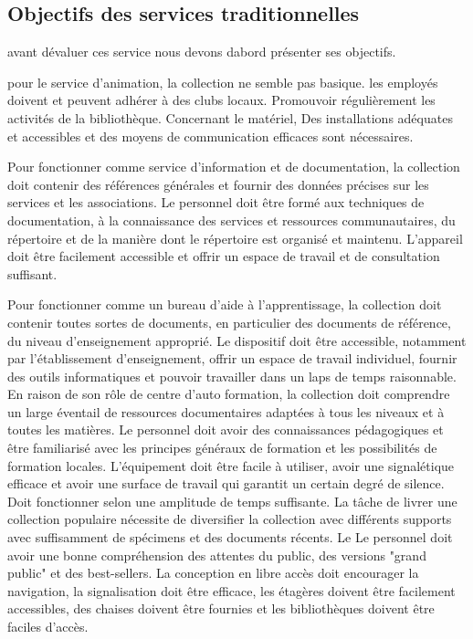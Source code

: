 \documentclass[french,a4paper,12pt]{article}
\begin{document}
\subsection{Objectifs des services traditionnelles}

\quad avant dévaluer ces service nous devons dabord présenter ses objectifs.

\quad pour le service  d'animation, la collection ne semble pas basique.  les employés doivent et peuvent adhérer à des clubs locaux. Promouvoir régulièrement les activités de la bibliothèque. Concernant le matériel, Des installations adéquates et accessibles et des moyens de communication efficaces sont nécessaires. 

\quad Pour fonctionner comme service d'information et de documentation, la collection doit contenir des références générales et fournir des données précises sur les services et les associations. Le personnel doit être formé aux techniques de documentation, à la connaissance des services et ressources communautaires, du répertoire et de la manière dont le répertoire est organisé et maintenu. L'appareil doit être facilement accessible et offrir un espace de travail et de consultation suffisant.  

\quad Pour fonctionner comme un bureau d'aide à l'apprentissage, la collection doit contenir toutes sortes de documents, en particulier des documents de référence, du niveau d'enseignement approprié. Le dispositif doit être accessible, notamment par l'établissement d'enseignement, offrir un espace de travail individuel, fournir des outils informatiques et pouvoir travailler dans un laps de temps raisonnable. 
En raison de son rôle de centre d'auto formation, la collection doit comprendre un large éventail de ressources documentaires adaptées à tous les niveaux et à toutes les matières. Le personnel doit avoir des connaissances pédagogiques et être familiarisé avec les principes généraux de formation et les possibilités de formation locales. L'équipement doit être facile à utiliser, avoir une signalétique efficace et avoir une surface de travail qui garantit un certain degré de silence. Doit fonctionner selon une amplitude de temps suffisante. La tâche de livrer une collection populaire nécessite de diversifier la collection avec différents supports avec suffisamment de spécimens et des documents récents. Le Le personnel doit avoir une bonne compréhension des attentes du public, des versions "grand public" et des best-sellers. La conception en libre accès doit encourager la navigation, la signalisation doit être efficace, les étagères doivent être facilement accessibles, des chaises doivent être fournies et les bibliothèques doivent être faciles d'accès. 
\end{document}
